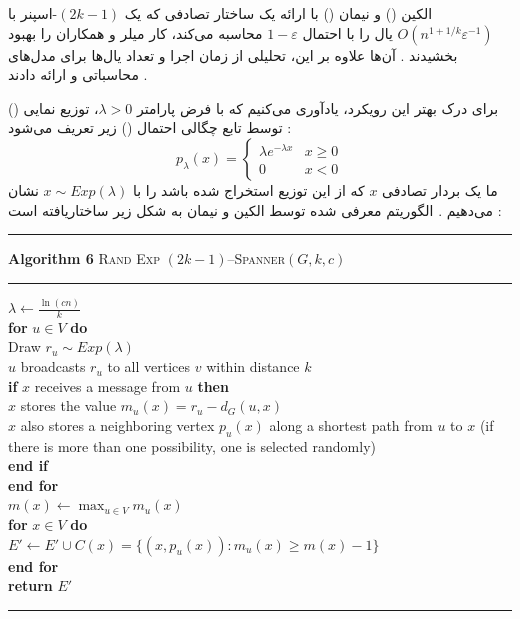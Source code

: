 \documentclass[12pt,a4paper]{article}
\begin{document}
الکین () و نیمان () با ارائه یک ساختار تصادفی که یک $(2k-1)$-اسپنر با $O(n^{1+1/k}\varepsilon^{-1})$ یال را با احتمال $1-\varepsilon$ محاسبه می‌کند، کار میلر و همکاران را بهبود بخشیدند \cite{elkin}. آن‌ها علاوه بر این، تحلیلی از زمان اجرا و تعداد یال‌ها برای مدل‌های محاسباتی  و  ارائه دادند \cite{elkin}.

برای درک بهتر این رویکرد، یادآوری می‌کنیم که با فرض پارامتر $\lambda > 0$، توزیع نمایی () توسط تابع چگالی احتمال () زیر تعریف می‌شود \cite{elkin}:
$$
p_\lambda(x) =
\begin{cases}
\lambda e^{-\lambda x} & x \ge 0 \\
0 & x < 0
\end{cases}
$$
ما یک بردار تصادفی $x$ که از این توزیع استخراج شده باشد را با $x \sim Exp(\lambda)$ نشان می‌دهیم \cite{elkin}. 
الگوریتم معرفی شده توسط الکین و نیمان به شکل زیر ساختاریافته است \cite{elkin}:

\vspace{0.5cm}
\noindent\begin{minipage}{\textwidth}
\begin{latin}
\noindent\rule{\textwidth}{0.4pt}
\textbf{Algorithm 6} \textsc{Rand Exp} $(2k - 1)$--\textsc{Spanner}$(G, k, c)$ \\
\rule{\textwidth}{0.4pt}
$\lambda \gets \frac{\ln(cn)}{k}$ \\
\textbf{for} $u \in V$ \textbf{do} \\
\hspace*{1em} Draw $r_u \sim Exp(\lambda)$ \\
\hspace*{1em} $u$ broadcasts $r_u$ to all vertices $v$ within distance $k$ \\
\hspace*{1em} \textbf{if} $x$ receives a message from $u$ \textbf{then} \\
\hspace*{2em} $x$ stores the value $m_u(x) = r_u - d_G(u, x)$ \\
\hspace*{2em} $x$ also stores a neighboring vertex $p_u(x)$ along a shortest path from $u$ to $x$ (if there is more than one possibility, one is selected randomly) \\
\hspace*{1em} \textbf{end if} \\
\textbf{end for} \\
$m(x) \gets \max_{u \in V} m_u(x)$ \\
\textbf{for} $x \in V$ \textbf{do} \\
\hspace*{1em} $E' \gets E' \cup C(x) = \{ (x, p_u(x)) : m_u(x) \ge m(x) - 1 \}$ \\
\textbf{end for} \\
\textbf{return} $E'$ \\
\rule{\textwidth}{0.4pt}
\end{latin}
\end{minipage}
\vspace{0.5cm}
\end{document}
